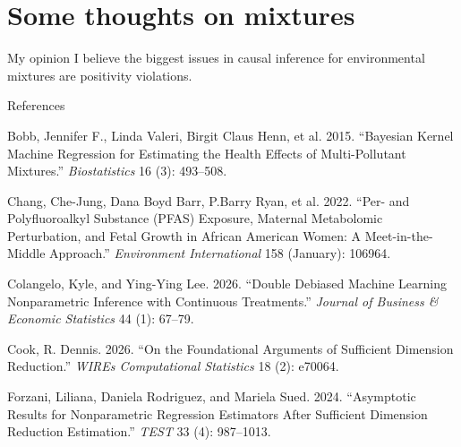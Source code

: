 \documentclass[
  ignorenonframetext,
  aspectratio=169,
  11pt]{beamer}
\newlength{\cslhangindent}
\newenvironment{CSLReferences}[2] %
 {\begin{list}{}{%
  \setlength{\itemindent}{0pt}
  \setlength{\leftmargin}{0pt}
  \setlength{\parsep}{0pt}
  \ifodd #1
   \setlength{\leftmargin}{\cslhangindent}
   \setlength{\itemindent}{-1\cslhangindent}
  \fi
  \setlength{\itemsep}{#2\baselineskip}}}
 {\end{list}}
\begin{document}
\section{Some thoughts on mixtures}\label{some-thoughts-on-mixtures}

\begin{frame}{My opinion}
\protect{}\label{my-opinion}
I believe the biggest issues in causal inference for environmental
mixtures are positivity violations.
\end{frame}

\begin{frame}[allowframebreaks]{References}
\protect{}\label{references}
\fontsize{6}{6.5}\selectfont
{}
\renewenvironment{CSLReferences}[2]
  {\begin{list}{}{%
    \setlength{\leftmargin}{1em}%
    \setlength{\itemindent}{-1em}%
    \setlength{\parsep}{0pt}%
    \setlength{\itemsep}{0pt}%
    \setlength{\topsep}{0pt}}%
    \fontsize{6}{6.5}\selectfont}
  {\end{list}}

\protect{}\label{refs}
\begin{CSLReferences}{1}{1}
Bobb, Jennifer F., Linda Valeri, Birgit Claus Henn, et al. 2015.
{``Bayesian Kernel Machine Regression for Estimating the Health Effects
of Multi-Pollutant Mixtures.''} \emph{Biostatistics} 16 (3): 493--508.

Chang, Che-Jung, Dana Boyd Barr, P.Barry Ryan, et al. 2022. {``Per- and
Polyfluoroalkyl Substance ({PFAS}) Exposure, Maternal Metabolomic
Perturbation, and Fetal Growth in {African American} Women: {A}
Meet-in-the-Middle Approach.''} \emph{Environment International} 158
(January): 106964.

Colangelo, Kyle, and Ying-Ying Lee. 2026. {``Double {Debiased Machine
Learning Nonparametric Inference} with {Continuous Treatments}.''}
\emph{Journal of Business \& Economic Statistics} 44 (1): 67--79.

Cook, R. Dennis. 2026. {``On the {Foundational Arguments} of {Sufficient
Dimension Reduction}.''} \emph{WIREs Computational Statistics} 18 (2):
e70064.

Forzani, Liliana, Daniela Rodriguez, and Mariela Sued. 2024.
{``Asymptotic Results for Nonparametric Regression Estimators After
Sufficient Dimension Reduction Estimation.''} \emph{TEST} 33 (4):
987--1013.


\end{CSLReferences}
\end{frame}
\end{document}
